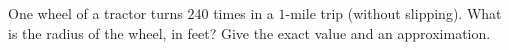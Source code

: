 One wheel of a tractor turns $240$ times in a $1$-mile trip (without slipping). What is the radius of the wheel, in feet? Give the exact value and an approximation.
